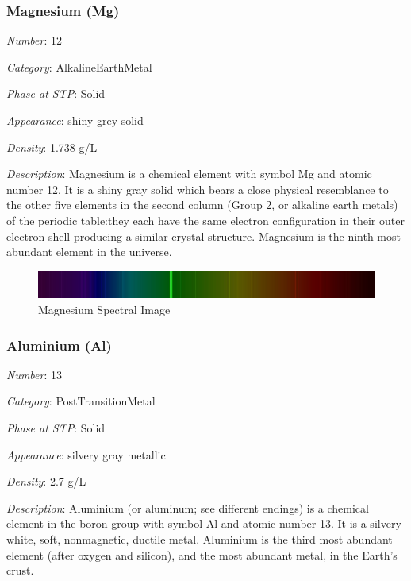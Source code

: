 \documentclass{article}
\begin{document}
\hypertarget{subsubsection::Mg}{}\subsubsection{Magnesium (Mg)}

\textit{Number}: 12

\textit{Category}: AlkalineEarthMetal

\textit{Phase at STP}: Solid

\textit{Appearance}: shiny grey solid

\textit{Density}: 1.738 g/L

\textit{Description}: Magnesium is a chemical element with symbol Mg and atomic number 12. It is a shiny gray solid which bears a close physical resemblance to the other five elements in the second column (Group 2, or alkaline earth metals) of the periodic table:they each have the same electron configuration in their outer electron shell producing a similar crystal structure. Magnesium is the ninth most abundant element in the universe.

\immediate{}
\begin{figure}[!ht]
    \centering
    \includegraphics[width=12cm]{./resources/spectral_img/Magnesium_Spectra.jpg}
    \caption{Magnesium Spectral Image}
\end{figure}

\hypertarget{subsubsection::Al}{}\subsubsection{Aluminium (Al)}

\textit{Number}: 13

\textit{Category}: PostTransitionMetal

\textit{Phase at STP}: Solid

\textit{Appearance}: silvery gray metallic

\textit{Density}: 2.7 g/L

\textit{Description}: Aluminium (or aluminum; see different endings) is a chemical element in the boron group with symbol Al and atomic number 13. It is a silvery-white, soft, nonmagnetic, ductile metal. Aluminium is the third most abundant element (after oxygen and silicon), and the most abundant metal, in the Earth's crust.
\end{document}
